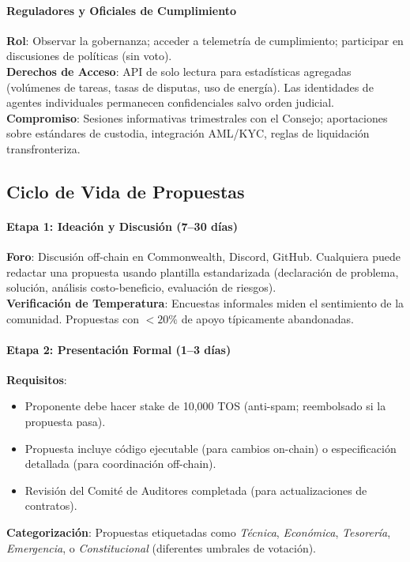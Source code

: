 \documentclass[11pt]{article}
\begin{document}
\paragraph{Reguladores y Oficiales de Cumplimiento}
\textbf{Rol}: Observar la gobernanza; acceder a telemetría de cumplimiento; participar en discusiones de políticas (sin voto).\\
\textbf{Derechos de Acceso}: API de solo lectura para estadísticas agregadas (volúmenes de tareas, tasas de disputas, uso de energía). Las identidades de agentes individuales permanecen confidenciales salvo orden judicial.\\
\textbf{Compromiso}: Sesiones informativas trimestrales con el Consejo; aportaciones sobre estándares de custodia, integración AML/KYC, reglas de liquidación transfronteriza.

\subsection{Ciclo de Vida de Propuestas}

\paragraph{Etapa 1: Ideación y Discusión (7--30 días)}
\textbf{Foro}: Discusión off-chain en Commonwealth, Discord, GitHub. Cualquiera puede redactar una propuesta usando plantilla estandarizada (declaración de problema, solución, análisis costo-beneficio, evaluación de riesgos).\\
\textbf{Verificación de Temperatura}: Encuestas informales miden el sentimiento de la comunidad. Propuestas con $<20\%$ de apoyo típicamente abandonadas.

\paragraph{Etapa 2: Presentación Formal (1--3 días)}
\textbf{Requisitos}:
\begin{itemize}[noitemsep]
  \item Proponente debe hacer stake de 10,000 TOS (anti-spam; reembolsado si la propuesta pasa).
  \item Propuesta incluye código ejecutable (para cambios on-chain) o especificación detallada (para coordinación off-chain).
  \item Revisión del Comité de Auditores completada (para actualizaciones de contratos).
\end{itemize}
\textbf{Categorización}: Propuestas etiquetadas como \emph{Técnica}, \emph{Económica}, \emph{Tesorería}, \emph{Emergencia}, o \emph{Constitucional} (diferentes umbrales de votación).
\end{document}
